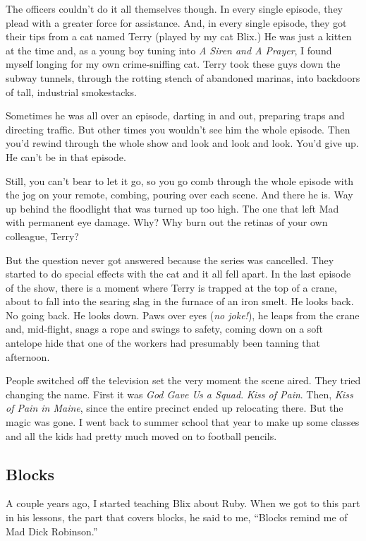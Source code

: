 \documentclass[12pt,twoside]{report}
\begin{document}
The officers couldn't do it all themselves though.  In every single
episode, they plead with a greater force for assistance.  And, in
every single episode, they got their tips from a cat named Terry
(played by my cat Blix.)  He was just a kitten at the time and, as a
young boy tuning into {\em A Siren and A Prayer}, I found myself
longing for my own crime-sniffing cat. Terry took these guys down the
subway tunnels, through the rotting stench of abandoned marinas, into
backdoors of tall, industrial smokestacks.

Sometimes he was all over an episode, darting in and out, preparing
traps and directing traffic. But other times you wouldn't see him the
whole episode.  Then you'd rewind through the whole show and look and
look and look.  You'd give up.  He can't be in that episode.

Still, you can't bear to let it go, so you go comb through the whole
episode with the jog on your remote, combing, pouring over each scene.
And there he is.  Way up behind the floodlight that was turned up too
high.  The one that left Mad with permanent eye damage.  Why?  Why
burn out the retinas of your own colleague, Terry?

But the question never got answered because the series was cancelled.
They started to do special effects with the cat and it all fell apart.
In the last episode of the show, there is a moment where Terry is
trapped at the top of a crane, about to fall into the searing slag in
the furnace of an iron smelt.  He looks back.  No going back.  He
looks down.  Paws over eyes ({\em no joke!}), he leaps from the crane
and, mid-flight, snags a rope and swings to safety, coming down on a
soft antelope hide that one of the workers had presumably been tanning
that afternoon.

People switched off the television set the very moment the scene
aired.  They tried changing the name. First it was {\em God Gave Us a
  Squad}.  {\em Kiss of Pain}.  Then, {\em Kiss of Pain in Maine},
since the entire precinct ended up relocating there.  But the magic
was gone.  I went back to summer school that year to make up some
classes and all the kids had pretty much moved on to football pencils.



\subsection{Blocks}



A couple years ago, I started teaching Blix about Ruby.  When we got
to this part in his lessons, the part that covers blocks, he said to
me, ``Blocks remind me of Mad Dick Robinson.''
\end{document}
